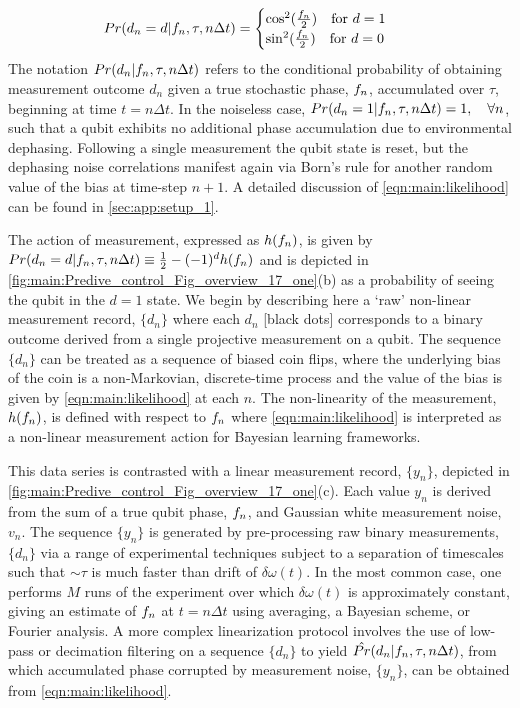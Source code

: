 \begin{align}
Pr(d_n=d | f_n, \tau, n \Delta t) &= \begin{cases} \cos^2(\frac{f_{n}}{2}) \quad \text{for $d=1$} \\   \sin^2(\frac{f_{n}}{2})  \quad \text{for $ d=0$}  \end{cases} \label{eqn:main:likelihood} 
\end{align}
The notation $Pr(d_n | f_n, \tau, n \Delta t)$ refers to the conditional probability of obtaining measurement outcome $d_n$ given a true stochastic phase, $f_n$, accumulated over $\tau$, beginning at time $t = n \Delta t$. In the noiseless case, $Pr(d_n=1|f_n, \tau, n \Delta t) = 1, \quad \forall n $, such that a qubit exhibits no additional phase accumulation due to environmental dephasing. Following a single measurement the qubit state is reset, but the dephasing noise correlations manifest again via Born's rule for another random value of the bias at time-step $n+1$. A detailed discussion of \cref{eqn:main:likelihood} can be found in \cref{sec:app:setup_1}.

The action of measurement, expressed as $h(f_n)$, is given by $Pr(d_n=d| f_n, \tau, n \Delta t) \equiv \frac{1}{2} - (-1)^d h(f_n) $ and is depicted in \cref{fig:main:Predive_control_Fig_overview_17_one}(b) as a probability of seeing the qubit in the $d=1$ state.  We begin by describing here a `raw' non-linear measurement record, $\{ d_n\}$ where each $d_n$ [black dots] corresponds to a binary outcome derived from a single projective measurement on a qubit. The sequence $\{ d_n\}$ can be treated as a sequence of biased coin flips, where the underlying bias of the coin is a non-Markovian, discrete-time process and the value of the bias is given by \cref{eqn:main:likelihood} at each $n$. The non-linearity of the measurement, $h(f_n)$, is defined with respect to $f_n$ where \cref{eqn:main:likelihood} is interpreted as a non-linear measurement action for Bayesian learning frameworks.

This data series is contrasted with a linear measurement record, $\{ y_n\}$, depicted in \cref{fig:main:Predive_control_Fig_overview_17_one}(c).  Each value $y_n$ is derived from the sum of a true qubit phase, $f_n$, and Gaussian white measurement noise, $v_n$.  The sequence $\{ y_n\}$ is generated by pre-processing raw binary measurements, $\{ d_n\}$ via a range of experimental techniques subject to a separation of timescales such that $\sim\tau$ is much faster than drift of $\delta \omega (t)$.  In the most common case, one performs $M$ runs of the experiment over which $\delta \omega (t)$ is approximately constant, giving an estimate of  $f_n$ at $t = n \Delta t $ using averaging, a Bayesian scheme, or Fourier analysis. A more complex linearization protocol involves the use of low-pass or decimation filtering on a sequence $\{ d_n\}$  to yield $\hat{Pr}(d_n | f_n, \tau, n\Delta t)$, from which accumulated phase corrupted by measurement noise, $\{ y_n\}$, can be obtained from \cref{eqn:main:likelihood}. 

